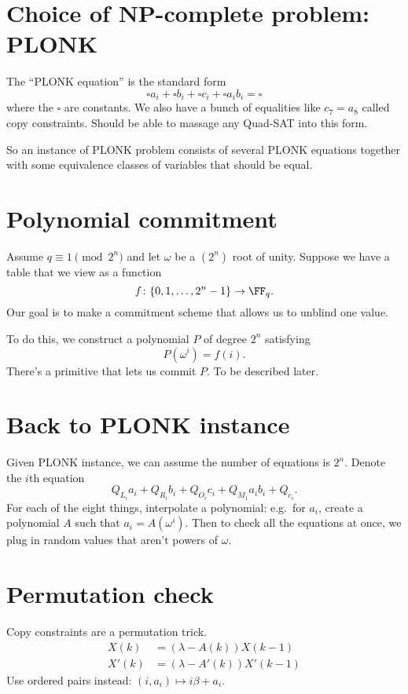 \documentclass[11pt]{scrreprt}
\begin{document}
\section{Choice of NP-complete problem: PLONK}
The ``PLONK equation'' is the standard form
\[ \square a_i + \square b_i + \square c_i + \square a_i b_i = \square \]
where the $\square$ are constants.
We also have a bunch of equalities like $c_7 = a_8$ called copy constraints.
Should be able to massage any Quad-SAT into this form.

So an instance of PLONK problem consists of several PLONK equations
together with some equivalence classes of variables that should be equal.

\section{Polynomial commitment}
Assume $q \equiv 1 \pmod{2^n}$
and let $\omega$ be a $(2^n)$ root of unity.
Suppose we have a table that we view as a function
\[ f \colon \{0,1,\dots,2^n-1\} \to \FF_q. \]
Our goal is to make a commitment scheme that allows us to unblind one value.

To do this, we construct a polynomial $P$ of degree $2^n$ satisfying
\[ P(\omega^i) = f(i). \]
There's a primitive that lets us commit $P$.
To be described later.

\section{Back to PLONK instance}
Given PLONK instance, we can assume the number of equations is $2^n$.
Denote the $i$th equation
\[ Q_{L_i} a_i + Q_{R_i} b_i + Q_{O_i} c_i + Q_{M_1} a_i b_i + Q_{c_i}. \]
For each of the eight things, interpolate a polynomial:
e.g.\ for $a_i$, create a polynomial $A$ such that $a_i = A(\omega^i)$.
Then to check all the equations at once,
we plug in random values that aren't powers of $\omega$.

\section{Permutation check}
Copy constraints are a permutation trick.
\begin{align*}
  X(k) &= (\lambda - A(k)) X(k-1) \\
  X'(k) &= (\lambda - A'(k)) X'(k-1)
\end{align*}
Use ordered pairs instead: $(i,a_i) \mapsto i \beta + a_i$.
\end{document}
